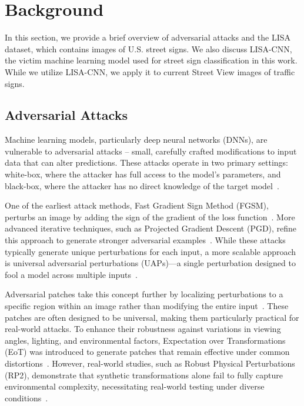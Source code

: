 \section{Background}
\label{background}

In this section, we provide a brief overview of adversarial attacks and the LISA dataset, which contains images of U.S. street signs. We also discuss LISA-CNN, the victim machine learning model used for street sign classification in this work. While we utilize LISA-CNN, we apply it to current Street View images of traffic signs.

\subsection{Adversarial Attacks}

Machine learning models, particularly deep neural networks (DNNs), are vulnerable to adversarial attacks -- small, carefully crafted modifications to input data that can alter predictions. These attacks operate in two primary settings: white-box, where the attacker has full access to the model’s parameters, and black-box, where the attacker has no direct knowledge of the target model~\cite{chakraborty2018adversarial,liang2022adversarial}.

One of the earliest attack methods, Fast Gradient Sign Method (FGSM), perturbs an image by adding the sign of the gradient of the loss function~\cite{goodfellow2014explaining}. More advanced iterative techniques, such as Projected Gradient Descent (PGD), refine this approach to generate stronger adversarial examples~\cite{mkadry2017towards}. While these attacks typically generate unique perturbations for each input, a more scalable approach is universal adversarial perturbations (UAPs)—a single perturbation designed to fool a model across multiple inputs~\cite{moosavi2017universal}.

Adversarial patches take this concept further by localizing perturbations to a specific region within an image rather than modifying the entire input~\cite{brown2017adversarial}. These patches are often designed to be universal, making them particularly practical for real-world attacks. To enhance their robustness against variations in viewing angles, lighting, and environmental factors, Expectation over Transformations (EoT) was introduced to generate patches that remain effective under common distortions~\cite{athalye2018synthesizing}. However, real-world studies, such as Robust Physical Perturbations (RP2), demonstrate that synthetic transformations alone fail to fully capture environmental complexity, necessitating real-world testing under diverse conditions~\cite{eykholt2018robust}.

